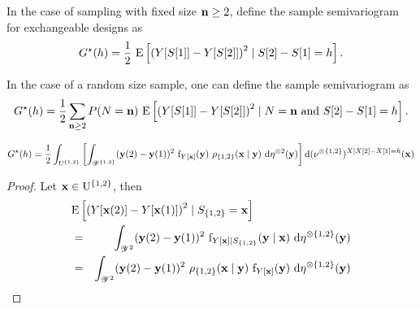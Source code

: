 


In the case of sampling with fixed size $\mathbf{n}\geq 2$, 
define the sample semivariogram for exchangeable designs as 
$$G^\star(h)=\frac12~\mathrm{E}\left[\left(Y[S[1]]-Y[S[2]]\right)^2\mid S[2]-S[1]=h \right].$$

In the case of a random size sample, one can define the sample semivariogram as 
$$G^\star(h)=\frac12\sum_{\mathbf{n}\geq2}P(N=\mathbf{n})~\mathrm{E}\left[\left(Y[S[1]]-Y[S[2]]\right)^2\mid N=\mathbf{n} \text { and }S[2]-S[1]=h \right].$$

\begin{property}
$$G^\star(h)=\frac12\int_{\mathrm{U}^{\{1,2\}}} \left[\int_{\mathscr{Y}^{\{1,2\}}} (\mathbf{y}(2)-\mathbf{y}(1))^2~ \mathrm{f}_{Y[\mathbf{x}]}(\mathbf{y})~
\rho_{\{1,2\}}(\mathbf{x}\mid\mathbf{y})~
\mathrm{d}\eta^{\otimes 2}(\mathbf{y})
\right] \mathrm{d}(\nu^{\otimes\{1, 2\}})^{X\mid X[2]-X[1]=h}(\mathbf{x})$$
\end{property}

\begin{proof}
Let $\mathbf{x}\in\mathrm{U}^{\{1,2\}}$, then
\begin{eqnarray*}
\lefteqn{\E\left[\left(\Signal[\position(2)]-\Signal[\position(1)]\right)^2\mid \Sample_{\{1,2\}}=\position\right]}\\
&=&\int_{\range{\Signal}^2} (\signal(2)-\signal(1))^2~
\density_{\Signal[\position]\mid S_{\{1,2\}}}(\signal\mid \position)~
\derive\dominantY^{\otimes\{1, 2\}}(\signal) \\
&=&\int_{\range{\Signal}^2} (\signal(2)-\signal(1))^2~
\densityratio_{\{1,2\}}(\position\mid\signal)~ \density_{\Signal[\position]}(\signal)~
\derive\dominantY^{\otimes\{1, 2\}}(\signal) \\
\end{eqnarray*}
\end{proof}

